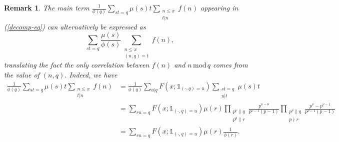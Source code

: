 \documentclass{article}
\newtheorem*{remark}{Remark}
\newcommand{\Mod}{\,\mathrm{mod}\,}
\newcommand{\Ind}{\mathbb{1}}
\begin{document}
\begin{remark}
    The main term $\frac{1}{\phi(q)}\sum_{st = q} \mu(s) t\sum_{\substack{n\le x \\ t|n}} f(n)$ appearing in (\ref{decomp-eq}) can alternatively be expressed as $$\sum_{st = q}\frac{\mu(s)}{\phi(s)}\sum_{\substack{n\le x \\ (n,q) = t}} f(n),$$ translating the fact the only correlation between $f(n)$ and $n \Mod q$ comes from the value of $(n,q).$ Indeed, we have
    \begin{align*}
        \frac{1}{\phi(q)}\sum_{st = q} \mu(s) t \sum_{\substack{n\le x\\ t|n}} f(n) &= \frac{1}{\phi(q)} \sum_{u|q} F(x; \Ind_{(\cdot, q) =u}) \sum_{\substack{st = q \\ u|t}} \mu(s)t
        \\&= \sum_{ru = q} F(x; \Ind_{(\cdot, q) =u}) \mu(r) \prod_{\substack{p^\nu\| q \\ p^\theta\|r}} \frac{p^{\nu-\theta}}{p^{\nu-1}(p-1)} \prod_{\substack{p^\nu\| q \\ p\nmid r}} \frac{p^{\nu} - p^{\nu-1}}{p^{\nu-1}(p-1)}
        \\&= \sum_{ru = q} F(x; \Ind_{(\cdot, q) =u}) \mu(r) \frac{1}{\phi(r)}.
    \end{align*}
\end{remark}
\end{document}
